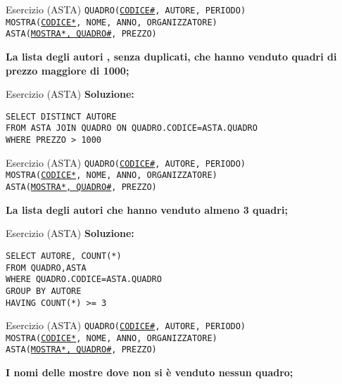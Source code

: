 \begin{frame}{Esercizio (ASTA)} 
    \texttt{QUADRO(\underline{CODICE\#}, AUTORE, PERIODO)\\
    MOSTRA(\underline{CODICE*}, NOME, ANNO, ORGANIZZATORE)\\
    ASTA(\underline{MOSTRA*, QUADRO\#}, PREZZO)}
    \vspace{1em}
    
    \textbf{La lista degli autori , senza duplicati, che hanno venduto
quadri di prezzo maggiore di 1000;}
\end{frame}

\begin{frame}{Esercizio (ASTA)}
    \textbf{Soluzione:}
    \vspace{1em}
    
    \texttt{SELECT DISTINCT AUTORE\\FROM ASTA JOIN QUADRO ON QUADRO.CODICE=ASTA.QUADRO\\WHERE
PREZZO > 1000}
    \end{frame}
\begin{frame}{Esercizio (ASTA) } 
    \texttt{QUADRO(\underline{CODICE\#}, AUTORE, PERIODO)\\
    MOSTRA(\underline{CODICE*}, NOME, ANNO, ORGANIZZATORE)\\
    ASTA(\underline{MOSTRA*, QUADRO\#}, PREZZO)}
    \vspace{1em}
    
    \textbf{La lista degli autori che hanno venduto almeno 3 quadri;}
\end{frame}

\begin{frame}{Esercizio (ASTA)}
    \textbf{Soluzione:}
    \vspace{1em}
    
    \texttt{SELECT AUTORE, COUNT(*)\\FROM QUADRO,ASTA\\WHERE QUADRO.CODICE=ASTA.QUADRO\\GROUP BY AUTORE
\\HAVING COUNT(*) >= 3}
    \end{frame}
\begin{frame}{Esercizio (ASTA) } 
    \texttt{QUADRO(\underline{CODICE\#}, AUTORE, PERIODO)\\
    MOSTRA(\underline{CODICE*}, NOME, ANNO, ORGANIZZATORE)\\
    ASTA(\underline{MOSTRA*, QUADRO\#}, PREZZO)}
    \vspace{1em}
    
    \textbf{I nomi delle mostre dove non si \`e venduto nessun quadro;}
\end{frame}

